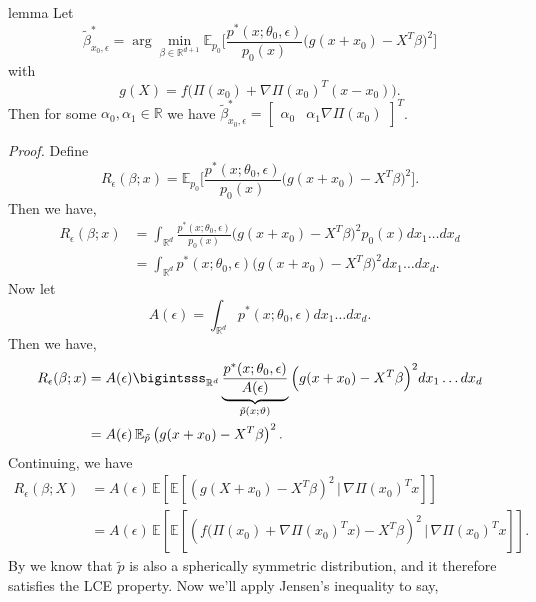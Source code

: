 \documentclass[11pt]{article}
\begin{document}
\begin{restatable}[Surrogate]{lemma}{} \label{lemma: surrogate problem} Let 
\[\tilde{\beta}^*_{x_0, \epsilon} = \arg\min_{\beta \in \mathbb{R}^{d+1}}\mathbb{E}_{ p_{0}}\Big[\frac{p^*(x;\theta_0, \epsilon)}{p_{0}(x)}\Big(g(x + x_0) - X^{T}\beta \Big)^2\Big]\]
with 
\[g(X) = f\Big(\Pi(x_0) + \nabla\Pi(x_0)^{T}(x-x_0)\Big).\]
Then for some $\alpha_0, \alpha_1 \in \mathbb{R}$ we have $\tilde{\beta}^*_{x_0, \epsilon} = \begin{bmatrix}\alpha_0  & \alpha_1\nabla \Pi(x_0) \end{bmatrix}^T$. 
\end{restatable}
\noindent \textit{Proof.} Define 
\[R_{\epsilon}(\beta; x) = \mathbb{E}_{ p_{0}}\Big[\frac{p^*(x;\theta_0, \epsilon)}{p_{0}(x)}\Big(g(x + x_0) - X^{T}\beta\Big)^2\Big].\]
Then we have,
\begin{align*}
    R_{\epsilon}(\beta; x)&= \int_{\mathbb{R}^d}\frac{p^*(x;\theta_0, \epsilon)}{p_{0}(x)}\Big(g(x+x_0) - X^{T}\beta\Big)^2p_{0}(x) dx_1 \dots dx_d \\
    &= \int_{\mathbb{R}^d}p^*(x;\theta_0, \epsilon)\Big(g(x + x_0) - X^{T}\beta \Big)^2 dx_1 \dots dx_d.
\end{align*}
Now let 
\begin{equation}
    A(\epsilon) = \int_{\mathbb{R}^d} p^*(x;\theta_0, \epsilon) dx_1 \dots dx_d.
\end{equation}
Then we have,
\begin{align*}
    R_{\epsilon}(\beta; x)&= A(\epsilon) \bigintsss_{\mathbb{R}^d}\underbrace{\frac{p^*(x;\theta_0, \epsilon)}{A(\epsilon)}}_{\tilde{p}(x;\vartheta)}\Big(g(x+x_0) - X^{T}\beta \Big)^2 dx_1 \dots dx_d \\
    &= A(\epsilon)\, \mathbb{E}_{ \tilde{p}}\left(g(x+x_0)-X^{T}\beta\right)^2.
\end{align*}
Continuing, we have
\begin{align*}
    R_{\epsilon}(\beta; X)&= A(\epsilon)\,\mathbb{E}\left[\mathbb{E}\left[\left(g(X+x_0)-X^{T}\beta\right)^2 \, \Big| 
    \, \nabla\Pi(x_0)^{T}x\right]\right]\\
    &= A(\epsilon)\,\mathbb{E}\left[\mathbb{E}\left[\left(f\Big(\Pi(x_0) + \nabla\Pi(x_0)^{T}x\Big)-X^{T}\beta\right)^2 \, \Big| 
    \, \nabla\Pi(x_0)^{T}x\right]\right].
\end{align*}
By  we know that $\tilde{p}$ is also a spherically symmetric distribution, and it therefore satisfies the LCE property. Now we'll apply Jensen's inequality to say,
\end{document}
